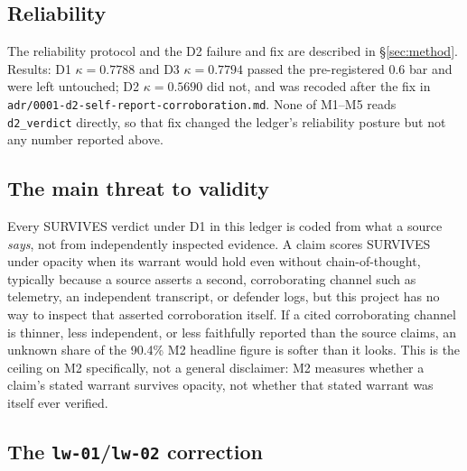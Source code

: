 \documentclass[10pt]{article}
\begin{document}
\subsection{Reliability}
\label{sec:results-reliability}

The reliability protocol and the D2 failure and fix are described in
\S\ref{sec:method}. Results: D1 $\kappa = 0.7788$ and D3 $\kappa = 0.7794$
passed the pre-registered 0.6 bar and were left untouched; D2
$\kappa = 0.5690$ did not, and was recoded after the fix in
\texttt{adr/0001-d2-self-report-corroboration.md}. None of M1--M5 reads
\texttt{d2\_verdict} directly, so that fix changed the ledger's reliability
posture but not any number reported above.

\subsection{The main threat to validity}
\label{sec:results-validity}

Every SURVIVES verdict under D1 in this ledger is coded from what a source
\emph{says}, not from independently inspected evidence. A claim scores
SURVIVES under opacity when its warrant would hold even without
chain-of-thought, typically because a source asserts a second, corroborating
channel such as telemetry, an independent transcript, or defender logs, but
this project has no way to inspect that asserted corroboration itself. If a
cited corroborating channel is thinner, less independent, or less
faithfully reported than the source claims, an unknown share of the 90.4\%
M2 headline figure is softer than it looks. This is the ceiling on M2
specifically, not a general disclaimer: M2 measures whether a claim's stated
warrant survives opacity, not whether that stated warrant was itself ever
verified.

\subsection{The \texttt{lw-01}/\texttt{lw-02} correction}
\label{sec:results-lw}
\end{document}
